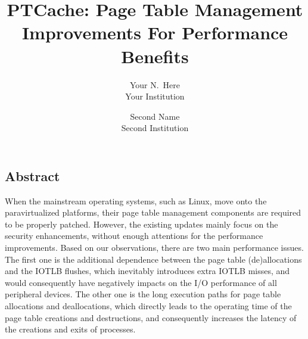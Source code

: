 \documentclass[letterpaper,twocolumn,10pt]{article}
\begin{document}
\newcommand{\name}{PTCache\xspace}
\newcommand{\eat}[1]{}  %
\newcommand{\authcomment}[3]{\textcolor{#3}{#1 says: #2}}\newcommand{\yueqiang}[1]{\authcomment{Yueqiang}{#1}{red}}
\newcommand{\zhi}[1]{\authcomment{Zhi}{#1}{red}}



\date{}

\title{\Large \bf PTCache: Page Table Management Improvements For Performance Benefits }

\author{
{\rm Your N.\ Here}\\
Your Institution
\and
{\rm Second Name}\\
Second Institution
} %

\maketitle

\thispagestyle{empty}


\subsection*{Abstract}
When the mainstream operating systems, such as Linux, move onto the paravirtualized platforms, their page table management components are required to be properly patched.
However, the existing updates mainly focus on the security enhancements, without enough attentions for the performance improvements.
Based on our observations, there are two main performance issues.
The first one is the additional dependence between the page table (de)allocations and the IOTLB flushes, which inevitably introduces extra IOTLB misses, and would consequently have negatively impacts on the I/O performance of all peripheral devices.
The other one is the long execution paths for page table allocations and deallocations, which directly leads to the operating time of the page table creations and destructions, and consequently increases the latency of the creations and exits of processes.
\end{document}
